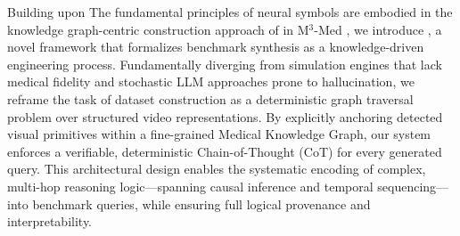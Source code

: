 Building upon The fundamental principles of neural symbols are embodied in the knowledge graph-centric construction approach of in M$^3$-Med \cite{m3med}, we introduce \PipelineName, a novel framework that formalizes benchmark synthesis as a knowledge-driven engineering process. 
Fundamentally diverging from simulation engines that lack medical fidelity and stochastic LLM approaches prone to hallucination, we reframe the task of dataset construction as a deterministic graph traversal problem over structured video representations. 
By explicitly anchoring detected visual primitives within a fine-grained Medical Knowledge Graph, our system enforces a verifiable, deterministic Chain-of-Thought (CoT) for every generated query. 
This architectural design enables the systematic encoding of complex, multi-hop reasoning logic—spanning causal inference and temporal sequencing—into benchmark queries, while ensuring full logical provenance and interpretability.

